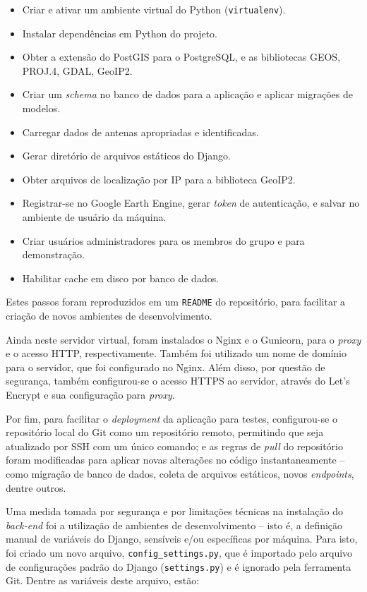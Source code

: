 \documentclass[]{politex}
\begin{document}
\begin{itemize}
\item Criar e ativar um ambiente virtual do Python (\texttt{virtualenv}).
\item Instalar dependências em Python do projeto.
\item Obter a extensão do PostGIS para o PostgreSQL, e as bibliotecas GEOS,
PROJ.4, GDAL, GeoIP2.
\item Criar um \textit{schema} no banco de dados para a aplicação e aplicar migrações
de modelos.
\item Carregar dados de antenas apropriadas e identificadas.
\item Gerar diretório de arquivos estáticos do Django.
\item Obter arquivos de localização por IP para a biblioteca GeoIP2.
\item Registrar-se no Google Earth Engine, gerar \textit{token} de autenticação,
e salvar no ambiente de usuário da máquina.
\item Criar usuários administradores para os membros do grupo e para
demonstração.
\item Habilitar cache em disco por banco de dados.
\end{itemize}

Estes passos foram reproduzidos em um \texttt{README} do repositório, para
facilitar a criação de novos ambientes de desenvolvimento.

Ainda neste servidor virtual, foram instalados o Nginx e o Gunicorn, para o
\textit{proxy} e o acesso HTTP, respectivamente. Também foi utilizado um nome de
domínio para o servidor, que foi configurado no Nginx. Além disso, por questão
de segurança, também configurou-se o acesso HTTPS ao servidor, através do Let's
Encrypt e sua configuração para \textit{proxy}.

Por fim, para facilitar o \textit{deployment} da aplicação para testes,
configurou-se o repositório local do Git como um repositório remoto, permitindo
que seja atualizado por SSH com um único comando; e as regras de \textit{pull}
do repositório foram modificadas para aplicar novas alterações no código
instantaneamente -- como migração de banco de dados, coleta de arquivos
estáticos, novos \textit{endpoints}, dentre outros.

Uma medida tomada por segurança e por limitações técnicas na instalação do
\textit{back-end} foi a utilização de ambientes de desenvolvimento -- isto é, a
definição manual de variáveis do Django, sensíveis e/ou específicas por máquina.
Para isto, foi criado um novo arquivo, \texttt{config\_settings.py}, que é
importado pelo arquivo de configurações padrão do Django (\texttt{settings.py})
e é ignorado pela ferramenta Git. Dentre as variáveis deste arquivo, estão:
\end{document}
